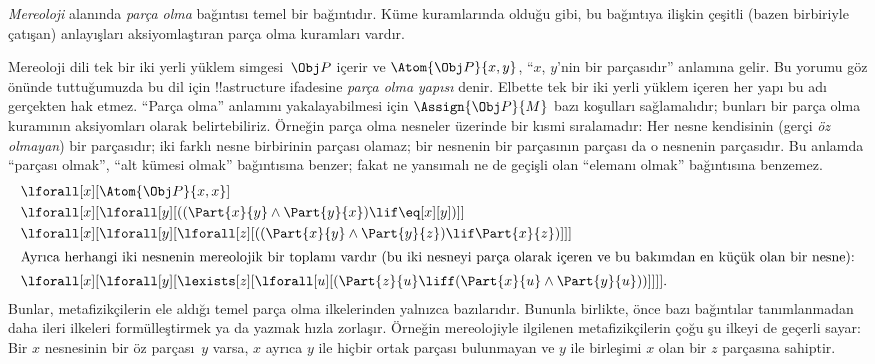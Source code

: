 \documentclass[../../../include/open-logic-section]{subfiles}
\begin{document}
\begin{ex}
\emph{Mereoloji} alanında \emph{parça olma} bağıntısı temel bir
bağıntıdır. Küme kuramlarında olduğu gibi, bu bağıntıya ilişkin çeşitli
(bazen birbiriyle çatışan) anlayışları aksiyomlaştıran parça olma
kuramları vardır.

Mereoloji dili tek bir iki yerli yüklem simgesi~$\Obj P$ içerir ve
$\Atom{\Obj P}{x,y}$, ``$x$, $y$'nin bir parçasıdır'' anlamına gelir.
Bu yorumu göz önünde tuttuğumuzda bu dil için !!a{structure}
ifadesine \emph{parça olma yapısı} denir. Elbette tek bir iki yerli
yüklem içeren her yapı bu adı gerçekten hak etmez. ``Parça olma''
anlamını yakalayabilmesi için $\Assign{\Obj P}{M}$ bazı koşulları
sağlamalıdır; bunları bir parça olma kuramının aksiyomları olarak
belirtebiliriz. Örneğin parça olma nesneler üzerinde bir kısmi
sıralamadır: Her nesne kendisinin (gerçi \emph{öz olmayan}) bir
parçasıdır; iki farklı nesne birbirinin parçası olamaz; bir nesnenin
bir parçasının parçası da o nesnenin parçasıdır. Bu anlamda ``parçası
olmak'', ``alt kümesi olmak'' bağıntısına benzer; fakat ne yansımalı ne
de geçişli olan ``elemanı olmak'' bağıntısına benzemez.
\begin{align*}
& \lforall[x][\Atom{\Obj P}{x,x}] \\
& \lforall[x][\lforall[y][((\Part{x}{y} \land \Part{y}{x})
      \lif \eq[x][y])]] \\
& \lforall[x][\lforall[y][\lforall[z][((\Part{x}{y} \land
        \Part{y}{z}) \lif \Part{x}{z})]]]\\
\intertext{Ayrıca herhangi iki nesnenin mereolojik bir toplamı vardır
(bu iki nesneyi parça olarak içeren ve bu bakımdan en küçük olan bir nesne):} &
\lforall[x][\lforall[y][\lexists[z][\lforall[u][(\Part{z}{u} \liff
        (\Part{x}{u} \land \Part{y}{u}))]]]].
\end{align*}
Bunlar, metafizikçilerin ele aldığı temel parça olma ilkelerinden
yalnızca bazılarıdır. Bununla birlikte, önce bazı bağıntılar
tanımlanmadan daha ileri ilkeleri formülleştirmek ya da yazmak hızla
zorlaşır. Örneğin mereolojiyle ilgilenen metafizikçilerin çoğu şu
ilkeyi de geçerli sayar: Bir $x$ nesnesinin bir öz parçası~$y$ varsa,
$x$ ayrıca $y$ ile hiçbir ortak parçası bulunmayan ve $y$ ile
birleşimi $x$ olan bir $z$ parçasına sahiptir.
\end{ex}
\end{document}
